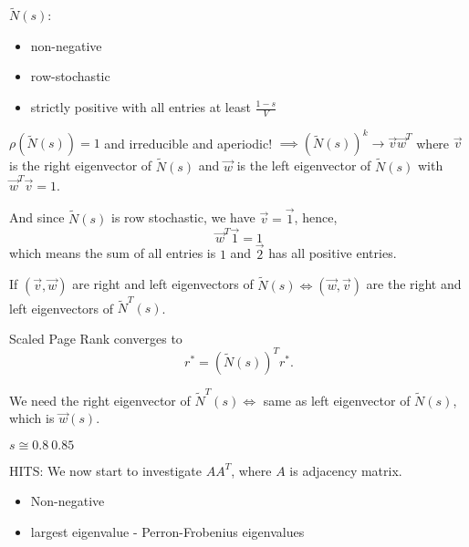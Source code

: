 \begin{note}
	\(\widetilde{N}(s)\):
	\begin{itemize}
		\item non-negative
		\item row-stochastic
		\item strictly positive with all entries at least \(\frac{1-s}{V}\)
	\end{itemize}
\end{note}
\(\rho(\widetilde{N}(s)) = 1\) and irreducible and aperiodic! \(\implies (\widetilde{N}(s))^k \to \vec{v}\vec{w}^{T}\) where
\(\vec{v}\) is the right eigenvector of \(\widetilde{N}(s)\) and \(\vec{w}\) is the left eigenvector of \(\widetilde{N}(s)\) with
\(\vec{w}^{T} \vec{v} = 1\).

And since \(\widetilde{N}(s)\) is row stochastic, we have \(\vec{v} = \vec{1}\), hence,
\[
	\vec{w}^{T}\vec{1} = 1
\]
which means the sum of all entries is \(1\) and \(\vec{2}\) has all positive entries.

If \((\vec{v}, \vec{w})\) are right and left eigenvectors of \(\widetilde{N}(s) \iff (\vec{w}, \vec{v})\) are the right and left eigenvectors
of \(\widetilde{N}^{T}(s)\).

Scaled Page Rank converges to
\[
	r^{*} = (\widetilde{N}(s))^{T}r^{*}.
\]

We need the right eigenvector of \(\widetilde{N}^{T}(s) \iff \) same as left eigenvector of \(\widetilde{N}(s)\), which is \(\vec{w}(s)\).

\begin{remark}
	\(s \cong 0.8 ~ 0.85\)
\end{remark}

\begin{prev}
	HITS: We now start to investigate \(A A^{T}\), where \(A\) is adjacency matrix.
	\begin{itemize}
		\item Non-negative
		\item largest eigenvalue - Perron-Frobenius eigenvalues
	\end{itemize}
\end{prev}
